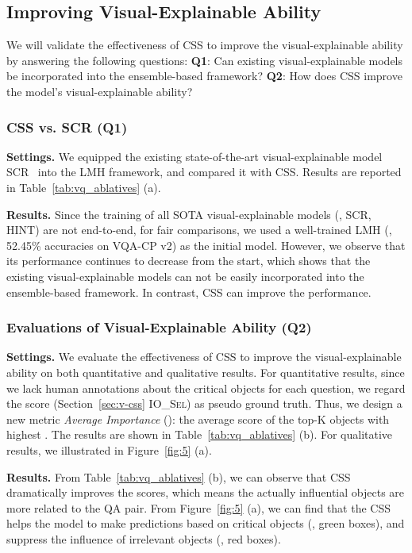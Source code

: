 \documentclass[10pt,twocolumn,letterpaper]{article}
\begin{document}
\subsection{Improving Visual-Explainable Ability}

We will validate the effectiveness of CSS to improve the visual-explainable ability by answering the following questions: \textbf{Q1}: Can existing visual-explainable models be incorporated into the ensemble-based framework? \textbf{Q2}: How does CSS improve the model's visual-explainable ability?


\subsubsection{CSS vs. SCR (Q1)}

\noindent\textbf{Settings.} We equipped the existing state-of-the-art visual-explainable model SCR~\cite{wu2019self} into the LMH framework, and compared it with CSS. Results are reported in Table~\ref{tab:vq_ablatives} (a).

\noindent\textbf{Results.} Since the training of all SOTA visual-explainable models (\eg, SCR, HINT) are not end-to-end, for fair comparisons, we used a well-trained LMH (\ie, 52.45\% accuracies on VQA-CP v2) as the initial model. However, we observe that its performance continues to decrease from the start, which shows that the existing visual-explainable models can not be easily incorporated into the ensemble-based framework. In contrast, CSS can improve the performance.


\subsubsection{Evaluations of Visual-Explainable Ability (Q2)}

\noindent\textbf{Settings.} We evaluate the effectiveness of CSS to improve the visual-explainable ability on both quantitative and qualitative results. For quantitative results, since we lack human annotations about the critical objects for each question, we regard the  score (Section~\ref{sec:v-css} \textsc{IO\_Sel}) as pseudo ground truth. Thus, we design a new metric \emph{Average Importance} (): the average  score of the top-K objects with highest . The results are shown in Table~\ref{tab:vq_ablatives} (b). For qualitative results, we illustrated in Figure~\ref{fig:5} (a).

\noindent\textbf{Results.} From Table~\ref{tab:vq_ablatives} (b), we can observe that CSS dramatically improves the  scores, which means the actually influential objects are more related to the QA pair. From Figure~\ref{fig:5} (a), we can find that the CSS helps the model to make predictions based on critical objects (\ie, green boxes), and suppress the influence of irrelevant objects (\ie, red boxes).
\end{document}
